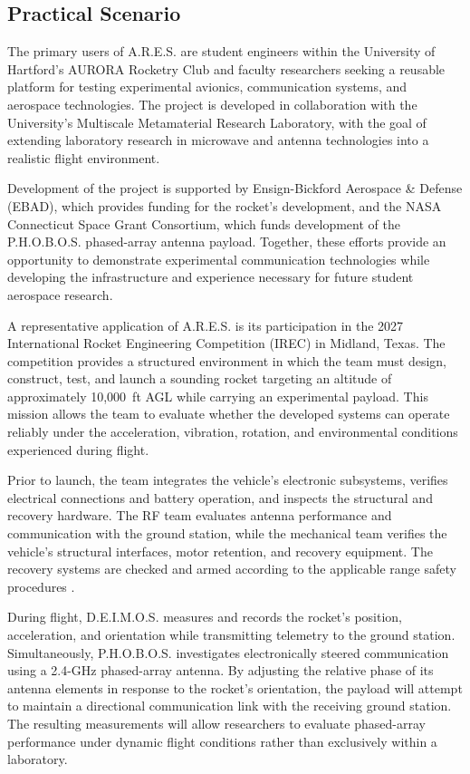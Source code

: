 \documentclass[11pt]{IEEEtran}
\newcommand{\ares}{A.R.E.S.}
\newcommand{\phobos}{P.H.O.B.O.S.}
\newcommand{\deimos}{D.E.I.M.O.S.}
\begin{document}
\subsection{Practical Scenario}

The primary users of \ares{} are student engineers within the
University of Hartford's AURORA Rocketry Club and faculty
researchers seeking a reusable platform for testing experimental
avionics, communication systems, and aerospace technologies.
The project is developed in collaboration with the University's
Multiscale Metamaterial Research Laboratory, with the goal of
extending laboratory research in microwave and antenna
technologies into a realistic flight environment.

Development of the project is supported by Ensign-Bickford
Aerospace \& Defense (EBAD), which provides funding for the
rocket's development, and the NASA Connecticut Space Grant
Consortium, which funds development of the \phobos{} phased-array
antenna payload. Together, these efforts provide an opportunity
to demonstrate experimental communication technologies while
developing the infrastructure and experience necessary for
future student aerospace research.

A representative application of \ares{} is its participation
in the 2027 International Rocket Engineering Competition
(IREC) in Midland, Texas. The competition provides a
structured environment in which the team must design,
construct, test, and launch a sounding rocket targeting
an altitude of approximately 10,000~ft AGL while carrying
an experimental payload. This mission allows the team
to evaluate whether the developed systems can operate
reliably under the acceleration, vibration, rotation,
and environmental conditions experienced during flight.

Prior to launch, the team integrates the vehicle's electronic
subsystems, verifies electrical connections and battery
operation, and inspects the structural and recovery hardware.
The RF team evaluates antenna performance and communication
with the ground station, while the mechanical team verifies
the vehicle's structural interfaces, motor retention,
and recovery equipment. The recovery systems are checked
and armed according to the applicable range safety
procedures \cite{tripoliCode}.

During flight, \deimos{} measures and records the rocket's
position, acceleration, and orientation while transmitting
telemetry to the ground station. Simultaneously, \phobos{}
investigates electronically steered communication using a
2.4-GHz phased-array antenna. By adjusting the relative
phase of its antenna elements in response to the rocket's
orientation, the payload will attempt to maintain a
directional communication link with the receiving ground
station. The resulting measurements will allow researchers
to evaluate phased-array performance under dynamic flight
conditions rather than exclusively within a laboratory.
\end{document}
